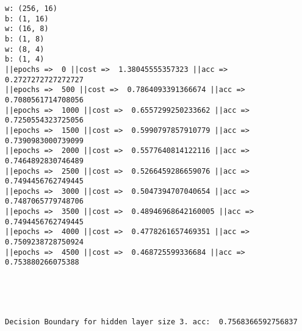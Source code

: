 \documentclass[11pt]{article}
\begin{document}
    \begin{Verbatim}[commandchars=\\\{\}]
w: (256, 16)
b: (1, 16)
w: (16, 8)
b: (1, 8)
w: (8, 4)
b: (1, 4)
||epochs =>  0 ||cost =>  1.38045555357323 ||acc =>  0.2727272727272727
||epochs =>  500 ||cost =>  0.7864093391366674 ||acc =>  0.7080561714708056
||epochs =>  1000 ||cost =>  0.6557299250233662 ||acc =>  0.7250554323725056
||epochs =>  1500 ||cost =>  0.5990797857910779 ||acc =>  0.7390983000739099
||epochs =>  2000 ||cost =>  0.5577640814122116 ||acc =>  0.7464892830746489
||epochs =>  2500 ||cost =>  0.5266459286659076 ||acc =>  0.7494456762749445
||epochs =>  3000 ||cost =>  0.5047394707040654 ||acc =>  0.7487065779748706
||epochs =>  3500 ||cost =>  0.48946968642160005 ||acc =>  0.7494456762749445
||epochs =>  4000 ||cost =>  0.4778261657469351 ||acc =>  0.7509238728750924
||epochs =>  4500 ||cost =>  0.468725599336684 ||acc =>  0.753880266075388

    \end{Verbatim}

    \begin{center}
    \end{center}
    { \hspace*{\fill} \\}
    
    \begin{center}
    \end{center}
    { \hspace*{\fill} \\}
    
    \begin{Verbatim}[commandchars=\\\{\}]
Decision Boundary for hidden layer size 3. acc:  0.7568366592756837

    \end{Verbatim}
\end{document}
